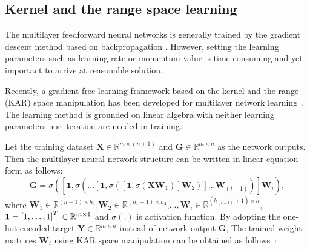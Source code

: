 \documentclass[runningheads]{llncs}
\begin{document}

\subsection{Kernel and the range space learning}\label{kar}

The multilayer feedforward neural networks is generally trained by the gradient descent method based on backpropagation \cite{goodfellow2016deep}.
However, setting the learning parameters such as learning rate or momentum value is time consuming and yet important to arrive at reasonable solution.

Recently, a gradient-free learning framework based on the kernel and the range (KAR) space manipulation has been developed for multilayer network learning~\cite{toh2018learning,toh2018gradient}.
The learning method is grounded on linear algebra with neither learning parameters nor iteration are needed in training.

Let the training dataset $\mathbf{X}\in{\mathbb{R}}^{m \times (n+1)}$ and $\mathbf{G}\in{\mathbb{R}}^{m \times n}$ as the network outputs.
Then the multilayer neural network structure can be written in linear equation form as follows:
\begin{equation}
    \mathbf{G} = \sigma\left(\left[\mathbf{1},\sigma\left(\dots\left[\mathbf{1},\sigma\left(\left[\mathbf{1},\sigma\left(\mathbf{X}\mathbf{W}_{1}\right)\right]\mathbf{W}_{2}\right)\right]\dots\mathbf{W}_{(i-1)}\right)\right]\mathbf{W}_{i}\right),
\end{equation}
where $\mathbf{W}_{1}\in{\mathbb{R}}^{(n+1) \times h_{1}}$,$\mathbf{W}_{2}\in{\mathbb{R}}^{(h_{1}+1) \times h_{2}}$,$\dots,\mathbf{W}_{i}\in{\mathbb{R}}^{(h_{(i-1)}+1) \times n}$,$\mathbf{1}=\left[1,\dots,1\right]^{T}\\
\in{\mathbb{R}}^{m \times 1}$ and $\sigma(.)$ is activation function.
By adopting the one-hot encoded target $\mathbf{Y}\in{\mathbb{R}}^{m \times n}$ instead of network output $\mathbf{G}$, The trained weight matrices $\mathbf{W}_{i}$ using KAR space manipulation can be obtained as follows~\cite{toh2018gradient}:
\end{document}
